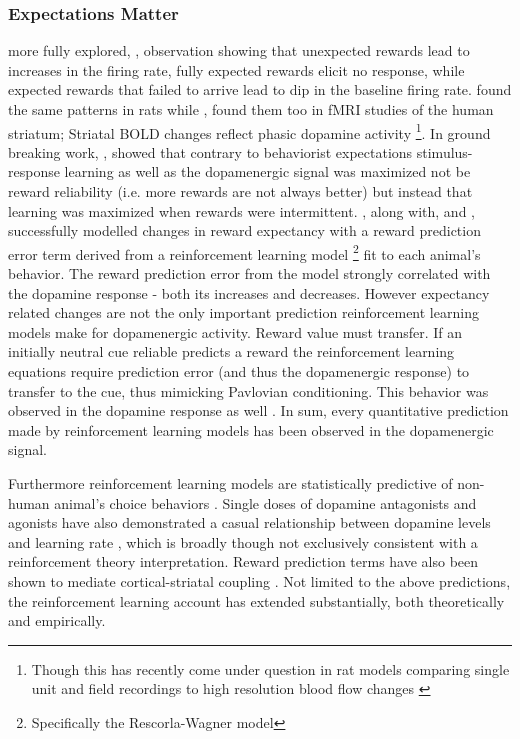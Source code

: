 \documentclass[doc,12pt]{apa}        %
\begin{document}
\subsubsection{Expectations Matter} %
\label{sub:the_classics}
 more fully explored, , observation showing that unexpected rewards lead to increases in the firing rate, fully expected rewards elicit no response, while expected rewards that failed to arrive lead to dip in the baseline firing rate.    found the same patterns in rats while , found them too in fMRI studies of the human striatum; Striatal BOLD changes reflect phasic dopamine  activity \cite{Schonberg:2009p6669,Surmeier:2007p4435}
\footnote{
    Though this has recently come under question in rat models comparing single unit and field recordings to high resolution blood flow changes \cite{Mishra:2011p9095}}. In ground breaking work, , showed that contrary to behaviorist expectations stimulus-response learning as well as the dopamenergic signal was maximized not be reward reliability (i.e. more rewards are not always better) but instead that learning was maximized when rewards were intermittent. , along with,  and , successfully modelled changes in reward expectancy with a reward prediction error term derived from a reinforcement learning model
\footnote{
    Specifically the Rescorla-Wagner model
} fit to each animal's behavior. The reward prediction error from the model strongly correlated with the dopamine response - both its increases and decreases. However expectancy related changes are not the only important prediction reinforcement learning models make for dopamenergic activity.  Reward value must transfer.  If an initially neutral cue reliable predicts a reward the reinforcement learning equations require prediction error (and thus the dopamenergic response) to transfer to the cue, thus mimicking Pavlovian conditioning.  This behavior was observed in the dopamine response as well \cite{Roesch:2007p2519, McClure:2003p3346}.  In sum, every quantitative prediction made by reinforcement learning models has been observed in the dopamenergic signal.

Furthermore reinforcement learning models are statistically predictive of non-human animal's choice behaviors \cite{Hampton:2007p2983}.  Single doses of dopamine antagonists and agonists have also demonstrated a casual relationship between dopamine levels and learning rate \cite{Pizzagalli:2008p6521, Diaconescu:2010p7631}, which is broadly though not exclusively consistent with a reinforcement theory interpretation.  Reward prediction terms have also been shown to mediate cortical-striatal coupling \cite{denOuden:2010p7203}.  Not limited to the above predictions, the reinforcement learning account has extended substantially, both theoretically and empirically.
\end{document}
